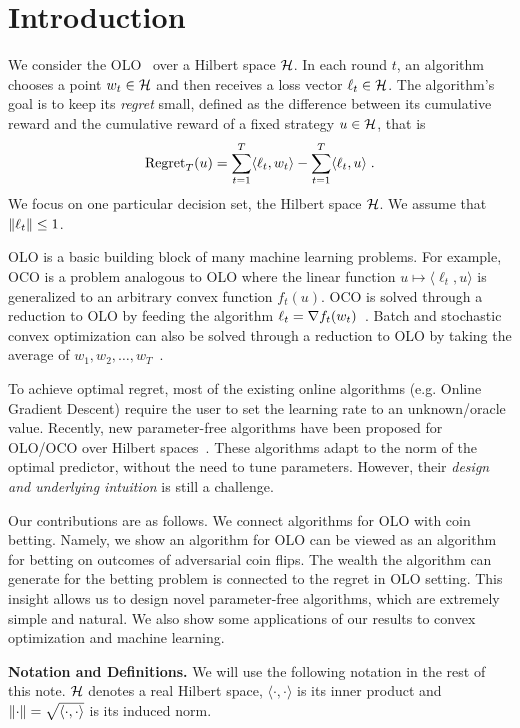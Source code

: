\section{Introduction}
\label{section:introduction}

We consider the \ac{OLO}~\citep{Cesa-Bianchi-Lugosi-2006, Shalev-Shwartz-2011}
over a Hilbert space $\mathcal{H}$. In each round $t$, an algorithm chooses a point $w_t
\in \mathcal{H}$ and then receives a loss vector $\ell_t \in \mathcal{H}$. The algorithm's goal is
to keep its \emph{regret} small, defined as the difference between its
cumulative reward and the cumulative reward of a fixed strategy $u \in \mathcal{H}$,
that is
\[
\operatorname{Regret}_T(u) = \sum_{t=1}^T \langle \ell_t, w_t \rangle - \sum_{t=1}^T \langle \ell_t, u \rangle  \; .
\]
We focus on one particular decision set, the Hilbert space $\mathcal{H}$.  We assume
that $\left\|{\ell_t}\right\| \le 1$.

\ac{OLO} is a basic building block of many machine learning problems. For
example, \ac{OCO} is a problem analogous to \ac{OLO} where
the linear function $u \mapsto \langle \ell_t, u \rangle$
is generalized to an arbitrary convex function $f_t(u)$. \ac{OCO} is solved
through a reduction to \ac{OLO} by feeding the algorithm $\ell_t = \nabla
f_t(w_t)$~\citep{Shalev-Shwartz-2011}.  Batch and stochastic convex
optimization can also be solved through a reduction to \ac{OLO} by
taking the average of $w_1, w_2, \dots, w_T$~\citep{Shalev-Shwartz-2011}.

To achieve optimal regret, most of the existing online algorithms (e.g.  Online
Gradient Descent) require the user to set the learning rate to an
unknown/oracle value. Recently, new parameter-free algorithms have been
proposed for \ac{OLO}/\ac{OCO} over Hilbert
spaces~\citep{Streeter-McMahan-2012, Orabona-2013, McMahan-Abernethy-2013,
McMahan-Orabona-2014, Orabona-2014, Orabona-Pal-2016-parameter-free}.  These algorithms adapt to the norm of the
optimal predictor, without the need to tune parameters. However, their
\emph{design and underlying intuition} is still a challenge.

Our contributions are as follows. We connect algorithms for \ac{OLO} with coin
betting. Namely, we show an algorithm for \ac{OLO} can be viewed as an
algorithm for betting on outcomes of adversarial coin flips. The wealth the
algorithm can generate for the betting problem is connected to the regret in
\ac{OLO} setting. This insight allows us to design novel parameter-free
algorithms, which are extremely simple and natural. We also show some
applications of our results to convex optimization and machine learning.

\noindent\textbf{Notation and Definitions.}
We will use the following notation in the rest of this note.  $\mathcal{H}$ denotes
a real Hilbert space, $\langle \cdot, \cdot \rangle$ is its inner product and
$\left\|{\cdot}\right\| = \sqrt{\langle \cdot, \cdot \rangle}$ is its induced norm.
